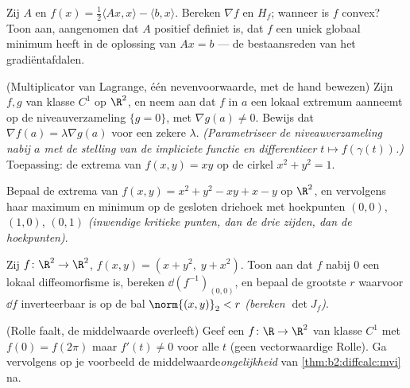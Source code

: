 \begin{exercise}[$\star\star$]\label{exo:b2:diffcalc:5}
Zij $A$  en $f(x) = \frac12\langle Ax, x\rangle -
\langle b, x\rangle$. Bereken $\nabla f$ en $H_f$; wanneer is $f$
convex? Toon aan, aangenomen dat $A$ positief definiet is, dat $f$
een uniek globaal minimum heeft in de oplossing van $Ax = b$ --- de
bestaansreden van het gradiëntafdalen.
\end{exercise}

\begin{exercise}[$\star\star$]\label{exo:b2:diffcalc:6}
(Multiplicator van Lagrange, één nevenvoorwaarde, met de hand
bewezen) Zijn $f, g$ van klasse $C^1$ op $\R^2$, en neem aan dat
$f$ in $a$ een lokaal extremum aanneemt op de niveauverzameling
$\{g = 0\}$, met $\nabla g(a) \neq 0$. Bewijs dat $\nabla f(a) =
\lambda\nabla g(a)$ voor een zekere $\lambda$. \emph{(Parametriseer
de niveauverzameling nabij $a$ met de stelling van de impliciete
functie en differentieer $t \mapsto f(\gamma(t))$.)} Toepassing: de
extrema van $f(x,y) = xy$ op de cirkel $x^2 + y^2 = 1$.
\end{exercise}

\begin{exercise}[$\star\star$]\label{exo:b2:diffcalc:7}
Bepaal de extrema van $f(x, y) = x^2 + y^2 - xy + x - y$ op $\R^2$,
en vervolgens haar maximum en minimum op de gesloten driehoek met
hoekpunten $(0,0)$, $(1,0)$, $(0,1)$ \emph{(inwendige kritieke
punten, dan de drie zijden, dan de hoekpunten)}.
\end{exercise}

\begin{exercise}[$\star\star\star$]\label{exo:b2:diffcalc:8}
Zij $f \colon \R^2 \to \R^2$, $f(x, y) = (x + y^2,\; y + x^2)$.
Toon aan dat $f$ nabij $0$ een lokaal diffeomorfisme is, bereken
$\dd(f^{-1})_{(0,0)}$, en bepaal de grootste $r$ waarvoor $\dd f$
inverteerbaar is op de bal $\norm{(x,y)}_2 < r$ \emph{(bereken
$\det J_f$)}.
\end{exercise}

\begin{exercise}[$\star\star\star$]\label{exo:b2:diffcalc:9}
(Rolle faalt, de middelwaarde overleeft) Geef een $f \colon \R \to
\R^2$ van klasse $C^1$ met $f(0) = f(2\pi)$ maar $f'(t) \neq 0$
voor alle $t$ (geen vectorwaardige Rolle). Ga vervolgens op je
voorbeeld de middelwaarde\emph{ongelijkheid} van
\cref{thm:b2:diffcalc:mvi} na.
\end{exercise}

